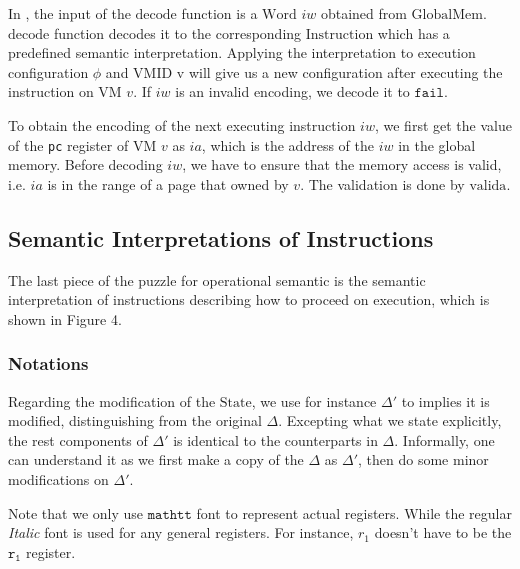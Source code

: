 \documentclass[a4paper]{article}
\newcommand*{\STATE}{\text{State}}
\newcommand*{\MEM}{\text{GlobalMem}}
\newcommand*{\WORD}{\text{Word}}
\newcommand*{\VMID}{\text{VMID}}
\newcommand*{\INSTR}{\text{Instruction}}
\newcommand*{\decode}{\text{decode}}
\newcommand*{\valida}{\text{valida}}
\newcommand{\refr}[1]{\hyperlink{#1}{\TirName {#1}}}
\begin{document}
In \refr{ExecInstr}, the input of the $\decode$ function is a $\WORD$ $iw$
obtained from $\MEM$. $\decode$ function decodes it to the corresponding
$\INSTR$ which has a predefined semantic interpretation. Applying the
interpretation to execution configuration $\phi$ and $\VMID$ v will give us a
new configuration after executing the instruction on VM $v$. If $iw$ is an
invalid encoding, we decode it to $\mathtt{fail}$.

To obtain the encoding of the next executing instruction $iw$, we first get the
value of the \texttt{pc} register of VM $v$ as $ia$, which is the address of the
$iw$ in the global memory. Before decoding $iw$, we have to ensure that the
memory access is valid, i.e. $ia$ is in the range of a page that owned by $v$.
The validation is done by $\valida$.


\subsection{Semantic Interpretations of Instructions}

The last piece of the puzzle for operational semantic
is the semantic interpretation of instructions describing how to proceed on
execution, which is shown in Figure 4.

\subsubsection{Notations}
Regarding the modification of the $\STATE$, we use for instance $\Delta'$ to
implies it is modified, distinguishing from the original $\Delta$. Excepting
what we state explicitly, the rest components of $\Delta'$ is identical to the
counterparts in $\Delta$. Informally, one can understand it as we first make a
copy of the $\Delta$ as $\Delta'$, then do some minor modifications on
$\Delta'$.

Note that we only use $\mathtt{mathtt}$ font to represent actual registers.
While the regular \emph{Italic} font is used for any general registers. For
instance, $r_{1}$ doesn't have to be the $\mathtt{r_{1}}$ register.
\end{document}
